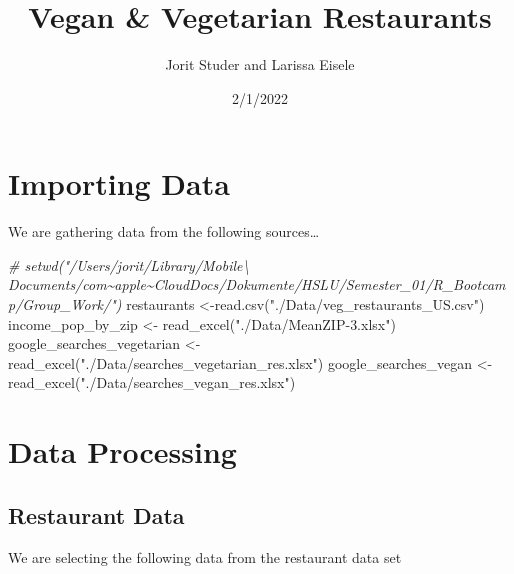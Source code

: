 \documentclass[
]{article}
\title{Vegan \& Vegetarian Restaurants}
\author{Jorit Studer and Larissa Eisele}
\date{2/1/2022}
\newenvironment{Shaded}{\begin{snugshade}}{\end{snugshade}}
\newcommand{\AttributeTok}[1]{\textcolor[rgb]{0.77,0.63,0.00}{#1}}
\newcommand{\CommentTok}[1]{\textcolor[rgb]{0.56,0.35,0.01}{\textit{#1}}}
\newcommand{\FunctionTok}[1]{\textcolor[rgb]{0.00,0.00,0.00}{#1}}
\newcommand{\NormalTok}[1]{#1}
\newcommand{\OtherTok}[1]{\textcolor[rgb]{0.56,0.35,0.01}{#1}}
\newcommand{\SpecialCharTok}[1]{\textcolor[rgb]{0.00,0.00,0.00}{#1}}
\newcommand{\StringTok}[1]{\textcolor[rgb]{0.31,0.60,0.02}{#1}}
\begin{document}
\maketitle

\hypertarget{importing-data}{%
\section{Importing Data}\label{importing-data}}

We are gathering data from the following sources\ldots{}

\begin{Shaded}
\begin{Highlighting}[]
\CommentTok{\# setwd("/Users/jorit/Library/Mobile\textbackslash{} Documents/com\textasciitilde{}apple\textasciitilde{}CloudDocs/Dokumente/HSLU/Semester\_01/R\_Bootcamp/Group\_Work/")}
\NormalTok{restaurants }\OtherTok{\textless{}{-}}\FunctionTok{read.csv}\NormalTok{(}\StringTok{"./Data/veg\_restaurants\_US.csv"}\NormalTok{)}
\NormalTok{income\_pop\_by\_zip }\OtherTok{\textless{}{-}} \FunctionTok{read\_excel}\NormalTok{(}\StringTok{"./Data/MeanZIP{-}3.xlsx"}\NormalTok{)}
\NormalTok{google\_searches\_vegetarian }\OtherTok{\textless{}{-}} \FunctionTok{read\_excel}\NormalTok{(}\StringTok{"./Data/searches\_vegetarian\_res.xlsx"}\NormalTok{)}
\NormalTok{google\_searches\_vegan }\OtherTok{\textless{}{-}} \FunctionTok{read\_excel}\NormalTok{(}\StringTok{"./Data/searches\_vegan\_res.xlsx"}\NormalTok{)}
\end{Highlighting}
\end{Shaded}

\hypertarget{data-processing}{%
\section{Data Processing}\label{data-processing}}

\hypertarget{restaurant-data}{%
\subsection{Restaurant Data}\label{restaurant-data}}

We are selecting the following data from the restaurant data set

\begin{Shaded}
\end{Shaded}
\end{document}
